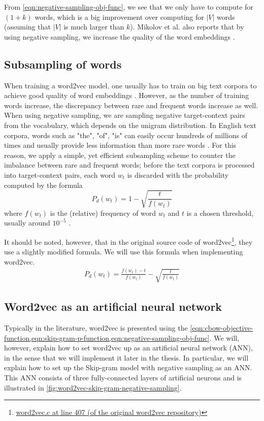 From \cref{eqn:negative-sampling-obj-func}, we see that we only have to compute for $(1 + k)$ words, which is a big improvement over computing for $|V|$ words (assuming that $|V|$ is much larger than $k$). Mikolov et al. also reports that by using negative sampling, we increase the quality of the word embeddings \cite{mikolov2013b}.

\subsection{Subsampling of words}
When training a word2vec model, one usually has to train on big text corpora to achieve good quality of word embeddings \cite{mikolov2013a}. However, as the number of training words increase, the discrepancy between rare and frequent words increase as well. When using negative sampling, we are sampling negative target-context pairs from the vocabulary, which depends on the unigram distribution. In English text corpora, words such as "the", "of", "is" can easily occur hundreds of millions of times and usually provide less information than more rare words \cite{mikolov2013b}. For this reason, we apply a simple, yet efficient subsampling scheme to counter the imbalance between rare and frequent words; before the text corpora is processed into target-context pairs, each word $w_t$ is discarded with the probability computed by the formula \cite{mikolov2013b, levy-etal-2015-improving}
\begin{equation}
    P_d(w_t) = 1 - \sqrt{\frac{t}{f(w_t)}}
\end{equation}
where $f(w_t)$ is the (relative) frequency of word $w_t$ and $t$ is a chosen threshold, usually around $10^{-5}$ \cite{mikolov2013b}.

It should be noted, however, that in the original source code of word2vec\footnote{\href{https://github.com/tmikolov/word2vec/blob/e092540633572b883e25b367938b0cca2cf3c0e7/word2vec.c\#L407}{word2vec.c at line 407 (of the original word2vec repository)}}, they use a slightly modified formula. We will use this formula when implementing word2vec.
\begin{align}
    P_d(w_t) = \frac{f(w_t) - t}{f(w_t)} - \sqrt{\frac{t}{f(w_t)}}
\end{align}

\subsection{Word2vec as an artificial neural network}
Typically in the literature, word2vec is presented using the \cref{eqn:cbow-objective-function,eqn:skip-gram-p-function,eqn:negative-sampling-obj-func}. We will, however, explain how to set word2vec up as an artificial neural network (ANN), in the sense that we will implement it later in the thesis. In particular, we will explain how to set up the Skip-gram model with negative sampling as an ANN. This ANN consists of three fully-connected layers of artificial neurons \cite{rong2016word2vec} and is illustrated in \cref{fig:word2vec-skip-gram-negative-sampling}.

